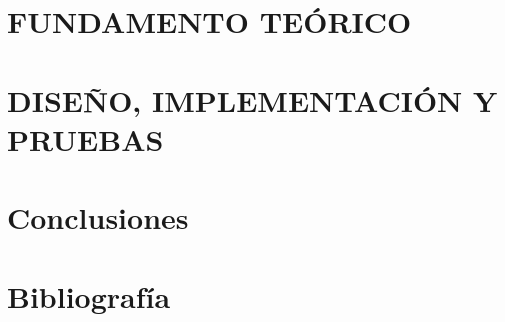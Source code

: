 \documentclass[a4paper,11pt,final]{book}
\begin{document}
 




\newpage
{}
\pagestyle{fancy} 
\tableofcontents







\part{FUNDAMENTO TEÓRICO}




\part{DISEÑO, IMPLEMENTACIÓN Y PRUEBAS}




\part{Conclusiones}
 			




\newpage
\part{Bibliografía}


\end{document}
